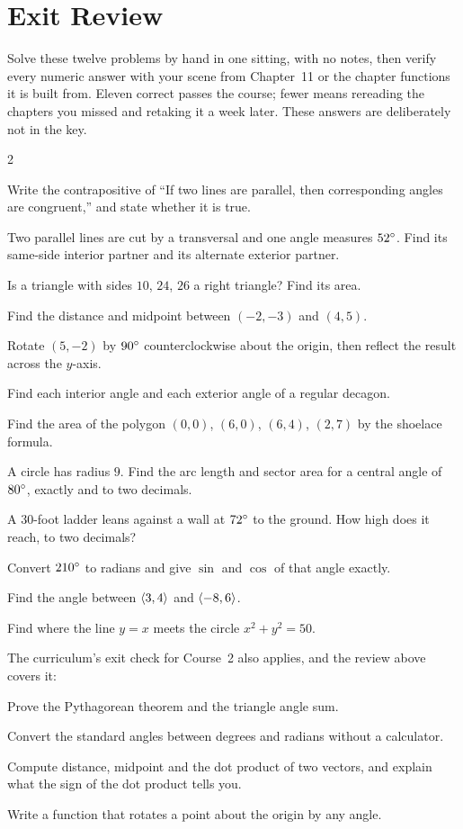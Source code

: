 \chapter*{Exit Review}

Solve these twelve problems by hand in one sitting, with no notes, then verify every numeric answer with your scene from Chapter~11 or the chapter functions it is built from. Eleven correct passes the course; fewer means rereading the chapters you missed and retaking it a week later. These answers are deliberately not in the key.

\begin{multicols}{2}
\begin{reviewexercises}
\item Write the contrapositive of ``If two lines are parallel, then corresponding angles are congruent,'' and state whether it is true.
\item Two parallel lines are cut by a transversal and one angle measures $52^\circ$. Find its same-side interior partner and its alternate exterior partner.
\item Is a triangle with sides $10$, $24$, $26$ a right triangle? Find its area.
\item Find the distance and midpoint between $(-2, -3)$ and $(4, 5)$.
\item Rotate $(5, -2)$ by $90^\circ$ counterclockwise about the origin, then reflect the result across the $y$-axis.
\item Find each interior angle and each exterior angle of a regular decagon.
\item Find the area of the polygon $(0, 0)$, $(6, 0)$, $(6, 4)$, $(2, 7)$ by the shoelace formula.
\item A circle has radius $9$. Find the arc length and sector area for a central angle of $80^\circ$, exactly and to two decimals.
\item A 30-foot ladder leans against a wall at $72^\circ$ to the ground. How high does it reach, to two decimals?
\item Convert $210^\circ$ to radians and give $\sin$ and $\cos$ of that angle exactly.
\item Find the angle between $\langle 3, 4 \rangle$ and $\langle -8, 6 \rangle$.
\item Find where the line $y = x$ meets the circle $x^2 + y^2 = 50$.
\end{reviewexercises}
\end{multicols}

\medskip
The curriculum's exit check for Course~2 also applies, and the review above covers it:

\begin{checklist}
\item Prove the Pythagorean theorem and the triangle angle sum.
\item Convert the standard angles between degrees and radians without a calculator.
\item Compute distance, midpoint and the dot product of two vectors, and explain what the sign of the dot product tells you.
\item Write a function that rotates a point about the origin by any angle.
\end{checklist}
